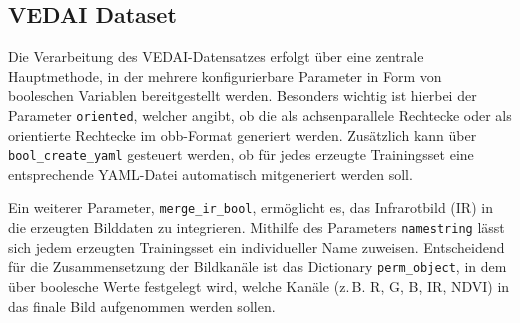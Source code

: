 \subsection{VEDAI Dataset}
\label{subsec:impl_VEDAI}


Die Verarbeitung des \acrshort{VEDAI}-Datensatzes erfolgt über eine zentrale Hauptmethode, in der mehrere konfigurierbare Parameter in Form von booleschen Variablen bereitgestellt werden. Besonders wichtig ist hierbei der Parameter \lstinline|oriented|, welcher angibt, ob die  als achsenparallele Rechtecke oder als orientierte Rechtecke im \acrshort{obb}-Format generiert werden. Zusätzlich kann über \lstinline|bool_create_yaml| gesteuert werden, ob für jedes erzeugte Trainingsset eine entsprechende \acrshort{YAML}-Datei automatisch mitgeneriert werden soll.

Ein weiterer Parameter, \lstinline|merge_ir_bool|, ermöglicht es, das Infrarotbild (IR) in die erzeugten Bilddaten zu integrieren. Mithilfe des Parameters \lstinline|namestring| lässt sich jedem erzeugten Trainingsset ein individueller Name zuweisen. Entscheidend für die Zusammensetzung der Bildkanäle ist das Dictionary \lstinline|perm_object|, in dem über boolesche Werte festgelegt wird, welche Kanäle (z.\,B. \acrshort{R}, \acrshort{G}, \acrshort{B}, \acrshort{IR}, \acrshort{NDVI}) in das finale Bild aufgenommen werden sollen.

